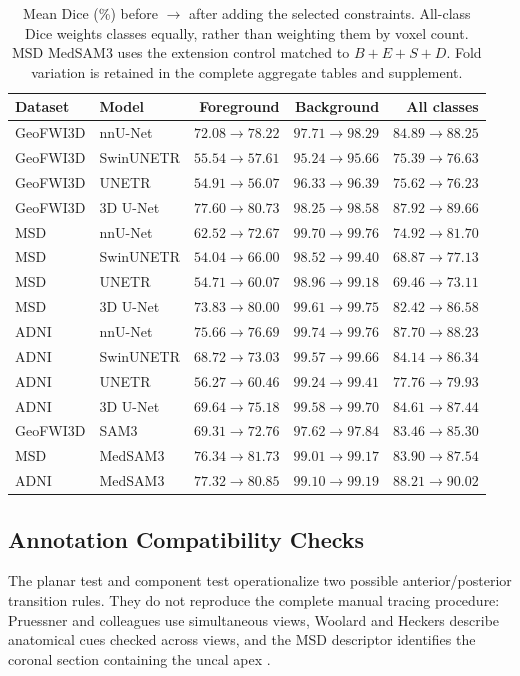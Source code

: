 \documentclass[12pt,a4paper]{article}
\begin{document}
\begin{table}[htbp]
\centering\footnotesize{}
\setlength{\tabcolsep}{4pt}\renewcommand{\arraystretch}{1.15}
\begin{tabular}{@{}llrrr@{}}
\hline
Dataset & Model & Foreground & Background & All classes \\
\hline
GeoFWI3D & nnU-Net & $72.08\to78.22$ & $97.71\to98.29$ & $84.89\to88.25$ \\
GeoFWI3D & SwinUNETR & $55.54\to57.61$ & $95.24\to95.66$ & $75.39\to76.63$ \\
GeoFWI3D & UNETR & $54.91\to56.07$ & $96.33\to96.39$ & $75.62\to76.23$ \\
GeoFWI3D & 3D U-Net & $77.60\to80.73$ & $98.25\to98.58$ & $87.92\to89.66$ \\
MSD & nnU-Net & $62.52\to72.67$ & $99.70\to99.76$ & $74.92\to81.70$ \\
MSD & SwinUNETR & $54.04\to66.00$ & $98.52\to99.40$ & $68.87\to77.13$ \\
MSD & UNETR & $54.71\to60.07$ & $98.96\to99.18$ & $69.46\to73.11$ \\
MSD & 3D U-Net & $73.83\to80.00$ & $99.61\to99.75$ & $82.42\to86.58$ \\
ADNI & nnU-Net & $75.66\to76.69$ & $99.74\to99.76$ & $87.70\to88.23$ \\
ADNI & SwinUNETR & $68.72\to73.03$ & $99.57\to99.66$ & $84.14\to86.34$ \\
ADNI & UNETR & $56.27\to60.46$ & $99.24\to99.41$ & $77.76\to79.93$ \\
ADNI & 3D U-Net & $69.64\to75.18$ & $99.58\to99.70$ & $84.61\to87.44$ \\
GeoFWI3D & SAM3 & $69.31\to72.76$ & $97.62\to97.84$ & $83.46\to85.30$ \\
MSD & MedSAM3 & $76.34\to81.73$ & $99.01\to99.17$ & $83.90\to87.54$ \\
ADNI & MedSAM3 & $77.32\to80.85$ & $99.10\to99.19$ & $88.21\to90.02$ \\
\hline
\end{tabular}
\caption{Mean Dice (\%) before $\to$ after adding the selected constraints. All-class Dice weights classes equally, rather than weighting them by voxel count. MSD MedSAM3 uses the extension control matched to $B+E+S+D$. Fold variation is retained in the complete aggregate tables and supplement.}
\label{tab:complementary-dice-summary}
\end{table}


\subsection{Annotation Compatibility Checks}
\label{sec:annotation-results}
The planar test and component test operationalize two possible
anterior/posterior transition rules. They do not reproduce the complete
manual tracing procedure: Pruessner and colleagues use simultaneous
views, Woolard and Heckers describe anatomical cues checked across
views, and the MSD descriptor identifies the coronal section containing
the uncal apex \cite{pruessner2000volumetry,woolard2012asymmetry,simpson2019dataset}.
\end{document}
